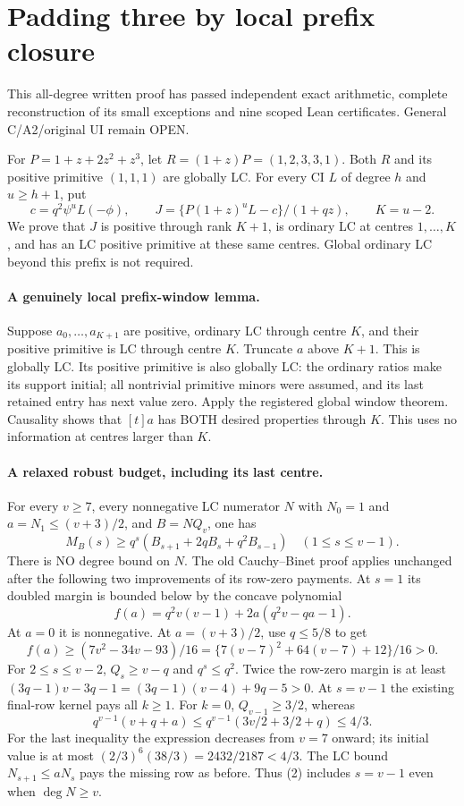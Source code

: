 \section{Padding three by local prefix closure}
This all-degree written proof has passed independent exact arithmetic,
complete reconstruction of its small exceptions and nine scoped Lean
certificates. General C/A2/original UI remain OPEN.

For $P=1+z+2z^2+z^3$, let $R=(1+z)P=(1,2,3,3,1)$.
Both $R$ and its positive primitive $(1,1,1)$ are globally LC.
For every CI $L$ of degree $h$ and $u\ge h+1$, put
\[
 c=q^2\psi^uL(-\phi),\qquad
 J=\{P(1+z)^uL-c\}/(1+qz),\qquad K=u-2.
\]
We prove that $J$ is positive through rank $K+1$, is ordinary LC
at centres $1,\ldots,K$, and has an LC positive primitive at these
same centres. Global ordinary LC beyond this prefix is not required.

\paragraph{A genuinely local prefix-window lemma.}
Suppose $a_0,\ldots,a_{K+1}$ are positive, ordinary LC through
centre $K$, and their positive primitive is LC through centre $K$.
Truncate $a$ above $K+1$. This is globally LC. Its positive primitive
is also globally LC: the ordinary ratios make its support initial;
all nontrivial primitive minors were assumed, and its last retained
entry has next value zero. Apply the registered global window theorem.
Causality shows that $[t]a$ has BOTH desired properties through $K$.
This uses no information at centres larger than $K$.

\paragraph{A relaxed robust budget, including its last centre.}
For every $v\ge7$, every nonnegative LC numerator $N$ with $N_0=1$
and $a=N_1\le(v+3)/2$, and $B=NQ_v$, one has
\[
 M_B(s)\ge q^s(B_{s+1}+2qB_s+q^2B_{s-1})
                         \quad(1\le s\le v-1).       \tag{2}
\]
There is NO degree bound on $N$. The old Cauchy--Binet proof applies
unchanged after the following two improvements of its row-zero payments.
At $s=1$ its doubled margin is bounded below by the concave polynomial
\[
 f(a)=q^2v(v-1)+2a(q^2v-qa-1).
\]
At $a=0$ it is nonnegative. At $a=(v+3)/2$, use $q\le5/8$ to get
\[
 f(a)\ge(7v^2-34v-93)/16
        =\{7(v-7)^2+64(v-7)+12\}/16>0.
\]
For $2\le s\le v-2$, $Q_s\ge v-q$ and $q^s\le q^2$.
Twice the row-zero margin is at least
$(3q-1)v-3q-1=(3q-1)(v-4)+9q-5>0$.
At $s=v-1$ the existing final-row kernel pays all $k\ge1$.
For $k=0$, $Q_{v-1}\ge3/2$, whereas
\[
 q^{v-1}(v+q+a)\le q^{v-1}(3v/2+3/2+q)\le4/3.
\]
For the last inequality the expression decreases from $v=7$ onward;
its initial value is at most $(2/3)^6(38/3)=2432/2187<4/3$.
The LC bound $N_{s+1}\le aN_s$ pays the missing row as before.
Thus (2) includes $s=v-1$ even when $\deg N\ge v$.

